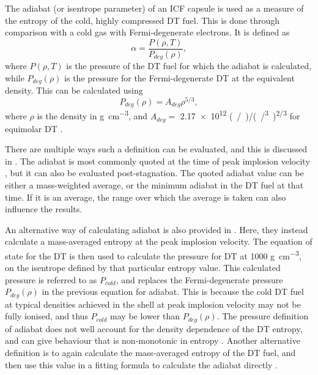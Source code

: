 The adiabat (or isentrope parameter) of an ICF capsule is used as a measure of the entropy of the cold, highly compressed DT fuel. This is done through comparison with a cold gas with Fermi-degenerate electrons. It is defined as \begin{equation} \alpha = \frac{P(\rho, T)}{P_{deg}(\rho)}, \label{eqn:adiabat} \end{equation} where $P(\rho, T)$ is the pressure of the DT fuel for which the adiabat is calculated, while $P_{deg}(\rho)$ is the pressure for the Fermi-degenerate DT at the equivalent density. This can be calculated using \begin{equation} P_{deg}(\rho) = A_{deg} \rho^{5/3}, \end{equation} where $\rho$ is the density in \unit{\gram\per\centi\meter\cubed}, and $A_{deg} = $ \num{2.17e12} \unit{(/)/(/^3)^{2/3}} for equimolar DT \cite{Atzeni2008}. 

There are multiple ways such a definition can be evaluated, and this is discussed in \cite{Haan2011}. The adiabat is most commonly quoted at the time of peak implosion velocity \cite{Park2014}, but it can also be evaluated post-stagnation. The quoted adiabat value can be either a mass-weighted average, or the minimum adiabat in the DT fuel at that time. If it is an average, the range over which the average is taken can also influence the results. 

An alternative way of calculating adiabat is also provided in \cite{Haan2011}. Here, they instead calculate a mass-averaged entropy at the peak implosion velocity. The equation of state for the DT is then used to calculate the pressure for DT at 1000 \unit{\gram\per\centi\meter\cubed}, on the isentrope defined by that particular entropy value. This calculated pressure is referred to as $P_{cold}$, and replaces the Fermi-degenerate pressure ${P_{deg}(\rho)}$ in the previous equation for adiabat. This is because the cold DT fuel at typical densities achieved in the shell at peak implosion velocity may not be fully ionised, and thus $P_{cold}$ may be lower than ${P_{deg}(\rho)}$. The pressure definition of adiabat does not well account for the density dependence of the DT entropy, and can give behaviour that is non-monotonic in entropy \cite{HainesPersonalComm}. Another alternative definition is to again calculate the mass-averaged entropy of the DT fuel, and then use this value in a fitting formula to calculate the adiabat directly \cite{Haan2011, Haines2022}.

